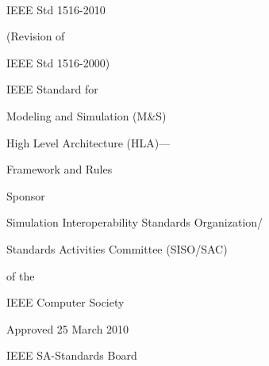 \thispagestyle{hlafrontlicense}
\begingroup
\setlength{\parskip}{0pt}
\setlength{\parindent}{0pt}

\noindent\hfill
\begin{minipage}[t]{1.52in}
    \raggedleft
    {\frontStdFont IEEE Std 1516\textsuperscript{\texttrademark}-2010\par}
    {\frontRevisionFont (Revision of\par IEEE Std 1516-2000)\par}
\end{minipage}

\vspace{153.3pt}

{\frontTitleFont
IEEE Standard for\par
Modeling and Simulation (M\&S)\par
High Level Architecture (HLA)---\par
Framework and Rules\par
}

\vspace{79.7pt}

{\frontLabelFont Sponsor\par}
\vspace{5.8pt}
{\frontSponsorFont
Simulation Interoperability Standards Organization/\par
Standards Activities Committee (SISO/SAC)\par
of the\par
IEEE Computer Society\par
}

\vspace{25.7pt}
{\frontLabelFont Approved 25 March 2010\par}
\vspace{5.5pt}
{\frontSponsorFont IEEE SA-Standards Board\par}
\endgroup
\clearpage
